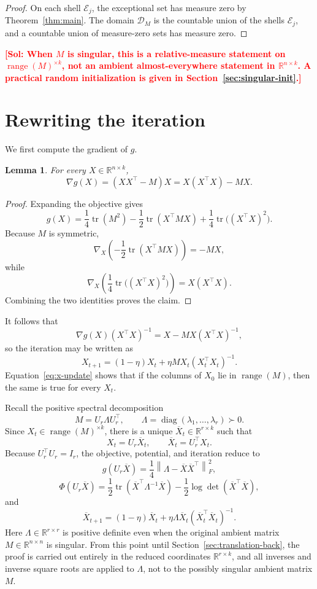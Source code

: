 \documentclass[11pt]{article}
\newcommand{\RR}{\mathbb{R}}
\newcommand{\range}{\operatorname{range}}
\newcommand{\tr}{\operatorname{tr}}
\newcommand{\diag}{\operatorname{diag}}
\newcommand{\cD}{\mathcal{D}}
\newcommand{\cE}{\mathcal{E}}
\newcommand{\sol}[1]{\textcolor{red}{\textbf{[Sol: #1]}}}
\newtheorem{lemma}{Lemma}
\begin{document}
\begin{proof}
On each shell \(\cE_j\), the exceptional set has measure zero by
Theorem~\ref{thm:main}. The domain \(\cD_M\) is the countable union of the
shells \(\cE_j\), and a countable union of measure-zero sets has measure zero.
\end{proof}

\sol{When \(M\) is singular, this is a relative-measure statement on \(\range(M)^{\times k}\), not an ambient almost-everywhere statement in \(\RR^{n\times k}\). A practical random initialization is given in Section~\ref{sec:singular-init}.}

\section{Rewriting the iteration}

We first compute the gradient of \(g\).

\begin{lemma}
For every \(X\in\RR^{n\times k}\),
\[
\nabla g(X)
=
(XX^\top-M)X
=
X(X^\top X)-MX.
\]
\end{lemma}

\begin{proof}
Expanding the objective gives
\[
g(X)
=
\frac14\tr(M^2)
-
\frac12\tr(X^\top MX)
+
\frac14\tr\bigl((X^\top X)^2\bigr).
\]
Because \(M\) is symmetric,
\[
\nabla_X\left(-\frac12\tr(X^\top MX)\right)
=
-MX,
\]
while
\[
\nabla_X\left(\frac14\tr\bigl((X^\top X)^2\bigr)\right)
=
X(X^\top X).
\]
Combining the two identities proves the claim.
\end{proof}

It follows that
\[
\nabla g(X)(X^\top X)^{-1}
=
X-MX(X^\top X)^{-1},
\]
so the iteration may be written as
\[
X_{t+1}
=
(1-\eta)X_t
+
\eta MX_t(X_t^\top X_t)^{-1}.
\tag{1}
\label{eq:x-update}
\]
Equation~\eqref{eq:x-update} shows that if the columns of \(X_0\) lie in
\(\range(M)\), then the same is true for every \(X_t\).

Recall the positive spectral decomposition
\[
M=U_r\Lambda U_r^\top,
\qquad
\Lambda=\diag(\lambda_1,\ldots,\lambda_r)\succ0.
\]
Since \(X_t\in\range(M)^{\times k}\), there is a unique
\(\overline X_t\in\RR^{r\times k}\) such that
\[
X_t=U_r\overline X_t,
\qquad
\overline X_t=U_r^\top X_t.
\]
Because \(U_r^\top U_r=I_r\), the objective, potential, and iteration reduce to
\[
g(U_r\overline X)
=
\frac14
\left\|
\Lambda-\overline X\overline X^\top
\right\|_F^2,
\]
\[
\Phi(U_r\overline X)
=
\frac12\tr(\overline X^\top\Lambda^{-1}\overline X)
-
\frac12\log\det(\overline X^\top\overline X),
\]
and
\[
\overline X_{t+1}
=
(1-\eta)\overline X_t
+
\eta\Lambda\overline X_t
(\overline X_t^\top\overline X_t)^{-1}.
\]
Here \(\Lambda\in\RR^{r\times r}\) is positive definite even when the original
ambient matrix \(M\in\RR^{n\times n}\) is singular. From this point until
Section~\ref{sec:translation-back}, the proof is carried out entirely in the
reduced coordinates \(\RR^{r\times k}\), and all inverses and inverse square
roots are applied to \(\Lambda\), not to the possibly singular ambient matrix
\(M\).
\end{document}

